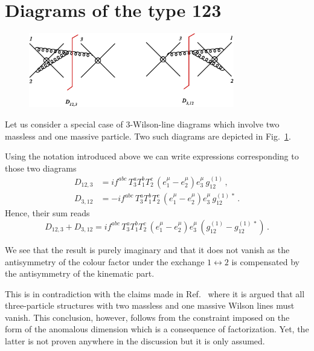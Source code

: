 \documentclass[a4paper,11pt]{report}
\numberwithin{equation}{section}
\begin{document}
\section{Diagrams of the type 123}

\begin{figure}[t]
  \begin{center}
    \includegraphics[width=0.80\textwidth]{plots/sf-nnlo-1cut123.png}
  \end{center}
  \caption{
  }
  \label{fig:diag123}
\end{figure}

Let us consider a special case of 3-Wilson-line diagrams which involve two
massless and one massive particle. Two such diagrams are depicted in
Fig.~\ref{fig:diag123}.

Using the notation introduced above we can write expressions corresponding to
those two diagrams
%
\begin{align}
  D_{12,3} & = i f^{abc}\, T_3^a T_1^b T_2^c\, 
             \left(e_1^\mu-e_2^\mu\right) e_3^\mu\, g_{12}^{(1)}\,,
  \\[0.5em]
  D_{3,12} & = -i f^{abc}\, T_3^a T_1^b T_2^c\, 
             \left(e_1^\mu-e_2^\mu\right) e_3^\mu\, g_{12}^{(1)\,*}\,.
\end{align}
%
Hence, their sum reads
%
\begin{equation}
  D_{12,3}  + D_{3,12}  = i f^{abc}\, T_3^a T_1^b T_2^c\, 
                          \left(e_1^\mu-e_2^\mu\right) e_3^\mu\,
	                  \left(g_{12}^{(1)}-g_{12}^{(1)\,*}\right)\,.
\end{equation}

We see that the result is purely imaginary and that it does not vanish as the
antisymmetry of the colour factor under the exchange $1 \leftrightarrow 2$ is
compensated by the antisymmetry of the kinematic part.

This is in contradiction with the claims made in Ref.~\cite{Becher:2009qa} where
it is argued that all three-particle structures with two massless and one
massive Wilson lines must vanish. This conclusion, however, follows from the
constraint imposed on the form of the anomalous dimension which is a consequence
of factorization. Yet, the latter is not proven anywhere in the discussion but
it is only assumed.
\end{document}
